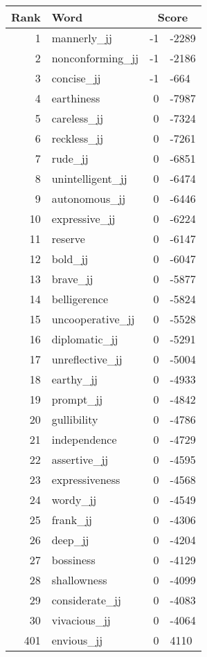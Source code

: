 \begin{longtable}[!htbp]{| rlr@{.}l |}
    \hline
    \textbf{Rank} & \textbf{Word} & \multicolumn{2}{c|}{\textbf{Score}} \\
    \hline
    \endhead
    1 & mannerly\_jj & -1 & -2289 \\
    2 & nonconforming\_jj & -1 & -2186 \\
    3 & concise\_jj & -1 & -664 \\
    4 & earthiness & 0 & -7987 \\
    5 & careless\_jj & 0 & -7324 \\
    6 & reckless\_jj & 0 & -7261 \\
    7 & rude\_jj & 0 & -6851 \\
    8 & unintelligent\_jj & 0 & -6474 \\
    9 & autonomous\_jj & 0 & -6446 \\
    10 & expressive\_jj & 0 & -6224 \\
    11 & reserve & 0 & -6147 \\
    12 & bold\_jj & 0 & -6047 \\
    13 & brave\_jj & 0 & -5877 \\
    14 & belligerence & 0 & -5824 \\
    15 & uncooperative\_jj & 0 & -5528 \\
    16 & diplomatic\_jj & 0 & -5291 \\
    17 & unreflective\_jj & 0 & -5004 \\
    18 & earthy\_jj & 0 & -4933 \\
    19 & prompt\_jj & 0 & -4842 \\
    20 & gullibility & 0 & -4786 \\
    21 & independence & 0 & -4729 \\
    22 & assertive\_jj & 0 & -4595 \\
    23 & expressiveness & 0 & -4568 \\
    24 & wordy\_jj & 0 & -4549 \\
    25 & frank\_jj & 0 & -4306 \\
    26 & deep\_jj & 0 & -4204 \\
    27 & bossiness & 0 & -4129 \\
    28 & shallowness & 0 & -4099 \\
    29 & considerate\_jj & 0 & -4083 \\
    30 & vivacious\_jj & 0 & -4064 \\
    401 & envious\_jj & 0 & 4110 \\

\end{longtable}
